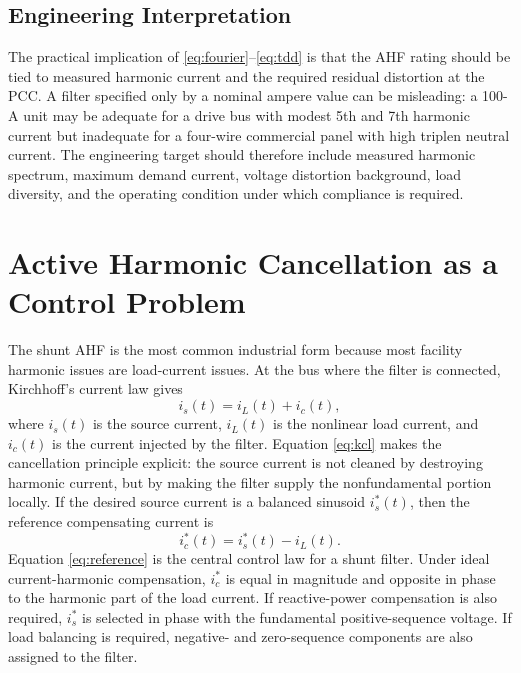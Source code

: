 \documentclass[conference]{IEEEtran}
\begin{document}
\subsection{Engineering Interpretation}
The practical implication of \eqref{eq:fourier}--\eqref{eq:tdd} is that the AHF rating should be tied to measured harmonic current and the required residual distortion at the PCC. A filter specified only by a nominal ampere value can be misleading: a 100-A unit may be adequate for a drive bus with modest 5th and 7th harmonic current but inadequate for a four-wire commercial panel with high triplen neutral current. The engineering target should therefore include measured harmonic spectrum, maximum demand current, voltage distortion background, load diversity, and the operating condition under which compliance is required.

\section{Active Harmonic Cancellation as a Control Problem}
The shunt AHF is the most common industrial form because most facility harmonic issues are load-current issues. At the bus where the filter is connected, Kirchhoff's current law gives
\begin{equation}
i_s(t)=i_L(t)+i_c(t),
\label{eq:kcl}
\end{equation}
where $i_s(t)$ is the source current, $i_L(t)$ is the nonlinear load current, and $i_c(t)$ is the current injected by the filter. Equation \eqref{eq:kcl} makes the cancellation principle explicit: the source current is not cleaned by destroying harmonic current, but by making the filter supply the nonfundamental portion locally. If the desired source current is a balanced sinusoid $i_s^{*}(t)$, then the reference compensating current is
\begin{equation}
i_c^{*}(t)=i_s^{*}(t)-i_L(t).
\label{eq:reference}
\end{equation}
Equation \eqref{eq:reference} is the central control law for a shunt filter. Under ideal current-harmonic compensation, $i_c^{*}$ is equal in magnitude and opposite in phase to the harmonic part of the load current. If reactive-power compensation is also required, $i_s^{*}$ is selected in phase with the fundamental positive-sequence voltage. If load balancing is required, negative- and zero-sequence components are also assigned to the filter.
\end{document}
